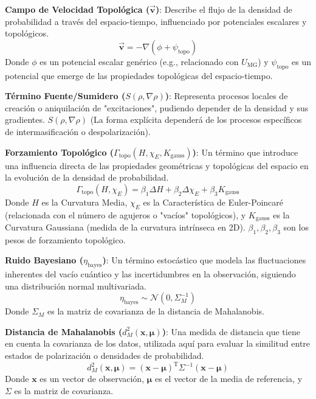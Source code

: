 \documentclass{book}
\newcommand{\bvec}[1]{\vec{\mathbf{#1}}}
\begin{document}
\textbf{Campo de Velocidad Topológica ($\bvec{v}$)}: Describe el flujo de la densidad de probabilidad a través del espacio-tiempo, influenciado por potenciales escalares y topológicos.
\begin{equation}
    \bvec{v}=-\nabla(\phi+\psi_{\text{topo}})
\end{equation}
Donde $\phi$ es un potencial escalar genérico (e.g., relacionado con $U_{\text{MG}}$) y $\psi_{\text{topo}}$ es un potencial que emerge de las propiedades topológicas del espacio-tiempo.

\textbf{Término Fuente/Sumidero ($S(\rho,\nabla\rho)$)}: Representa procesos locales de creación o aniquilación de "excitaciones", pudiendo depender de la densidad y sus gradientes.
$S(\rho,\nabla\rho)$
(La forma explícita dependerá de los procesos específicos de intermasificación o despolarización).

\textbf{Forzamiento Topológico ($\Gamma_{\text{topo}}(H,\chi_E,K_{\text{gauss}})$)}: Un término que introduce una influencia directa de las propiedades geométricas y topológicas del espacio en la evolución de la densidad de probabilidad.
\begin{equation}
    \Gamma_{\text{topo}}(H,\chi_E)=\beta_1\Delta H+\beta_2\Delta\chi_E+\beta_3 K_{\text{gauss}}
\end{equation}
Donde $H$ es la Curvatura Media, $\chi_E$ es la Característica de Euler-Poincaré (relacionada con el número de agujeros o "vacíos" topológicos), y $K_{\text{gauss}}$ es la Curvatura Gaussiana (medida de la curvatura intrínseca en 2D). $\beta_1,\beta_2,\beta_3$ son los pesos de forzamiento topológico.

\textbf{Ruido Bayesiano ($\eta_{\text{bayes}}$)}: Un término estocástico que modela las fluctuaciones inherentes del vacío cuántico y las incertidumbres en la observación, siguiendo una distribución normal multivariada.
\begin{equation}
    \eta_{\text{bayes}}\sim\mathcal{N}(0,\Sigma_M^{-1})
\end{equation}
Donde $\Sigma_M$ es la matriz de covarianza de la distancia de Mahalanobis.

\textbf{Distancia de Mahalanobis ($d_M^2(\mathbf{x},\boldsymbol{\mu})$)}: Una medida de distancia que tiene en cuenta la covarianza de los datos, utilizada aquí para evaluar la similitud entre estados de polarización o densidades de probabilidad.
\begin{equation}
    d_M^2(\mathbf{x},\boldsymbol{\mu})=(\mathbf{x}-\boldsymbol{\mu})^{\mathrm{T}}\Sigma^{-1}(\mathbf{x}-\boldsymbol{\mu})
\end{equation}
Donde $\mathbf{x}$ es un vector de observación, $\boldsymbol{\mu}$ es el vector de la media de referencia, y $\Sigma$ es la matriz de covarianza.
\end{document}
